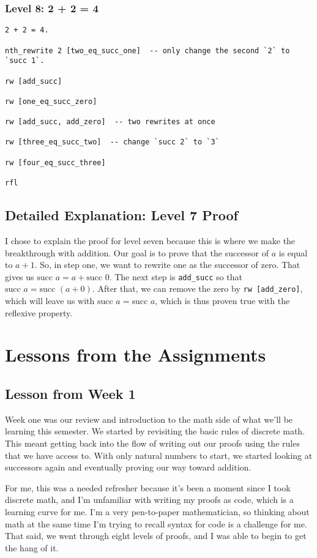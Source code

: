 \documentclass{article}
\begin{document}
\subsubsection*{Level 8: 2 + 2 = 4}
\begin{lstlisting}[style=leanstyle]
2 + 2 = 4.

nth_rewrite 2 [two_eq_succ_one]  -- only change the second `2` to `succ 1`.

rw [add_succ]

rw [one_eq_succ_zero]

rw [add_succ, add_zero]  -- two rewrites at once

rw [three_eq_succ_two]  -- change `succ 2` to `3`

rw [four_eq_succ_three]

rfl
\end{lstlisting}

\subsection*{Detailed Explanation: Level 7 Proof}
I chose to explain the proof for level seven because this is where we make the breakthrough with addition. Our goal is to prove that the successor of \(a\) is equal to \(a + 1\). So, in step one, we want to rewrite one as the successor of zero. That gives us \(\text{succ } a = a + \text{succ } 0\). The next step is \texttt{add\_succ} so that \(\text{succ } a = \text{succ } (a + 0)\). After that, we can remove the zero by \texttt{rw [add\_zero]}, which will leave us with \(\text{succ } a = \text{succ } a\), which is thus proven true with the reflexive property.

\section*{Lessons from the Assignments}
\subsection*{Lesson from Week 1}
Week one was our review and introduction to the math side of what we'll be learning this semester. We started by revisiting the basic rules of discrete math. This meant getting back into the flow of writing out our proofs using the rules that we have access to. With only natural numbers to start, we started looking at successors again and eventually proving our way toward addition.

For me, this was a needed refresher because it's been a moment since I took discrete math, and I'm unfamiliar with writing my proofs as code, which is a learning curve for me. I'm a very pen-to-paper mathematician, so thinking about math at the same time I'm trying to recall syntax for code is a challenge for me. That said, we went through eight levels of proofs, and I was able to begin to get the hang of it.
\end{document}
